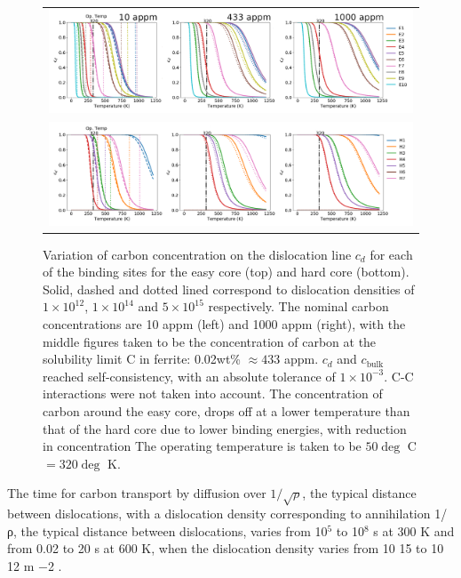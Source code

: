 \documentclass[a4paper,11pt]{article}
\begin{document}
\begin{landscape}
   \begin{figure}	
       \begin{tabular}{c}
      	        \includegraphics[width=1.65\textwidth]{../Images/cd_easy_core_ferrite_sc_all_10_433_1000_appm.png}  \\
      	        \includegraphics[width=1.65\textwidth]{../Images/cd_hard_core_ferrite_sc_all_10_433_1000_appm.png}  \\

          	   \end{tabular}		
   \caption{ Variation of carbon concentration on the dislocation line $c_d$ for each of the binding sites for the easy core (top) and hard core (bottom). Solid, dashed and dotted lined correspond to dislocation densities of $1\times10^{12}$, $1\times10^{14}$ and $5\times10^{15}$ respectively. The nominal carbon concentrations are 10 appm (left) and 1000 appm (right), with the middle figures taken to be the concentration of carbon at the solubility limit C in ferrite: 0.02wt\% $\approx433$ appm. $c_d$ and $c_{\text{bulk}}$ reached self-consistency, with an absolute tolerance of $1\times10^{-3}$. C-C interactions were not taken into account. The concentration of carbon around the easy core, drops off at a lower temperature than that of the hard core due to lower binding energies, with reduction in concentration  The operating temperature is taken to be $50\deg$ C $= 320 \deg$ K. }
   \label{cdhardeasy}
      \end{figure}
      \end{landscape}


The time for carbon transport by diffusion over \(1/\sqrt{\rho}\), the typical distance between
dislocations, with a dislocation density corresponding
to annihilation 1/ ρ, the typical distance between dislocations, varies from 10\(^{\text{5}}\) to 10\(^{\text{8}}\) s at 300
K and from 0.02 to 20 s at 600 K, when the dislocation density varies from 10 15 to 10 12 m −2 .
\end{document}
